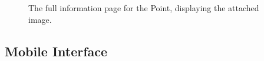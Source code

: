\documentclass{article}
\begin{document}
		\begin{figure}[H]
			\centering
			\caption{The full information page for the Point, displaying the attached image.}
			\label{fig:eval-cb-4}
		\end{figure}

		\FloatBarrier

		\subsection{Mobile Interface}
\end{document}
